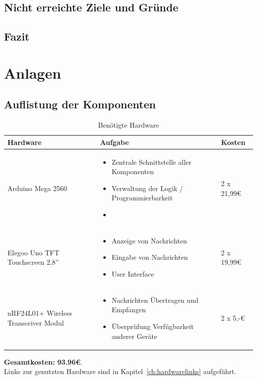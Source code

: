 \documentclass[a4paper, 11pt]{scrartcl}
\begin{document}
\subsection{Nicht erreichte Ziele und Gründe}


\subsection{Fazit}
\newpage
\section{Anlagen}
\subsection{Auflistung der Komponenten}
\begin{small}

\begin{table}[H]
    \caption{Benötigte Hardware}\label{tab:hardware}
    \begin{tabular}{|p{}|p{}|p{}|}
        \hline
        \textbf{Hardware} & \textbf{Aufgabe} & \textbf{Kosten}
        \\
        \hline\hline
        Arduino Mega 2560 
        & 
        \begin{itemize}
            \item Zentrale Schnittstelle aller Komponenten
            \item Verwaltung der Logik / Programmierbarkeit
            \item 
        \end{itemize} 
        & 
        2 x 21,99€
        \\
        \hline
        Elegoo Uno TFT Touchscreen 2,8''
        &
        \begin{itemize}
            \item Anzeige von Nachrichten
            \item Eingabe von Nachrichten
            \item User Interface
        \end{itemize}
        &
        2 x 19,99€
        \\
        \hline
        nRF24L01+ Wireless Transceiver Modul
        &
        \begin{itemize}
            \item Nachrichten Übertragen und Empfangen
            \item Überprüfung Verfügbarkeit anderer Geräte
        \end{itemize}
        &
        2 x 5,-€
        \\
        \hline
    \end{tabular}
\end{table}
\textbf{Gesamtkosten: 93.96€}. 
\\
Links zur genutzten Hardware sind in Kapitel~\ref{ch:hardwarelinks} aufgeführt.


\end{small}
\end{document}
